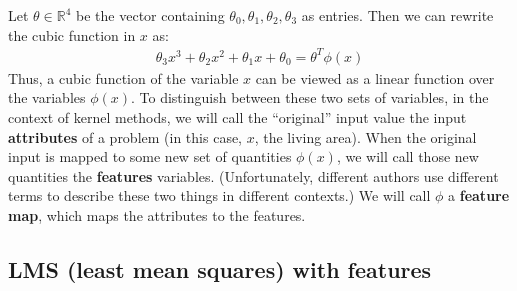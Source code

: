 \documentclass{article}
\begin{document}
Let $\theta\in \mathbb{R}^4$ be the vector containing $\theta_0, \theta_1,\theta_2,\theta_3$ as entries. Then we can rewrite the cubic function in $x$ as:
\begin{align}
\theta_3 x^3 + \theta_2 x^2 + \theta_1 x+ \theta_0 = \theta^T \phi (x) \nonumber
\end{align}
Thus, a cubic function of the variable $x$ can be viewed as a linear function over the variables $\phi(x)$. 
To distinguish between these two sets of variables, in the context of kernel methods, we will
call the ``original'' input value the input {\bf attributes} of a problem
(in this case, $x$, the living area).  When the original input is mapped to some new set of
quantities $\phi(x)$, %
we will call those
new quantities the {\bf features} variables.  (Unfortunately, different authors
use different terms to describe these two things in different contexts.)  We will call $\phi$ 
a {\bf feature map}, which maps the attributes to the features.

\subsection{LMS (least mean squares) with features}
\newcommand{\nf}{p}
\end{document}
